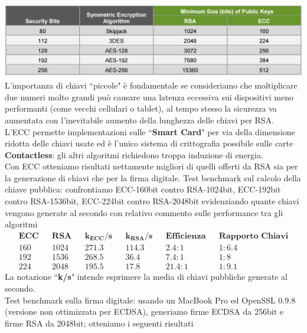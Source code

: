 \documentclass[a4paper,12pt]{tesiinfo}
\begin{document}
\includegraphics[scale=0.45]{RSAvECC_table}
\\
L'importanza di chiavi ``piccole" \`e fondamentale se consideriamo che moltiplicare due numeri molto grandi pu\`o causare una latenza eccessiva sui dispositivi meno performanti (come vecchi cellulari o tablet), al tempo stesso la sicurezza va aumentata con l'inevitabile aumento della lunghezza delle chiavi per RSA.
\\
L'ECC permette implementazioni sulle ``\textbf{Smart Card}" per via della dimensione ridotta delle chiavi usate ed \`e l'unico sistema di crittografia possibile sulle carte \textbf{Contactless}: gli altri algoritmi richiedono troppa induzione di energia.
\\
Con ECC otteniamo risultati nettamente migliori di quelli offerti da RSA sia per la generazione di chiavi che per la firma digitale. 
Test benchmark sul calcolo della chiave pubblica: confrontiamo ECC-160bit contro RSA-1024bit, ECC-192bit contro RSA-1536bit, ECC-224bit contro RSA-2048bit evidenziando quante chiavi vengono generate al secondo con relativo commento sulle performance tra gli algoritmi 
\begin{align*}
 &\textbf{ECC}& &\textbf{RSA}& &\textbf{$\mathbold{k_{ECC}}$/s}& &\textbf{$\mathbold{k_{RSA}}$/s}& &\textbf{Efficienza}& &\textbf{Rapporto Chiavi}&\\
 &160& &1024& &271.3& &114.3& &2.4:1& &1:6.4&\\
 &192& &1536& &268.5& &36.4& &7.4:1& &1:8&\\
 &224& &2048& &195.5& &17.8& &21.4:1& &1:9.1&
\end{align*}
La notazione ``\textbf{k/s}" intende esprimere la media di chiavi pubbliche generate al secondo.
\\
Test benchmark sulla firma digitale: usando un MacBook Pro ed OpenSSL 0.9.8 (versione non ottimizzata per ECDSA), generiamo firme ECDSA da 256bit e firme RSA da 2048bit; otteniamo i seguenti risultati
\end{document}

